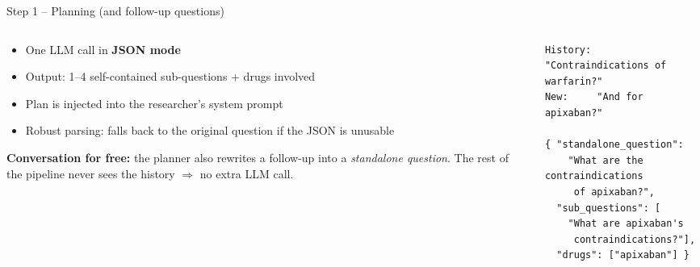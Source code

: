 \documentclass[aspectratio=169,11pt]{beamer}
\begin{document}
\begin{frame}[fragile]{Step 1 -- Planning (and follow-up questions)}
  \begin{columns}[T]
    \begin{column}{0.5\textwidth}
      \begin{itemize}
        \item One LLM call in \textbf{JSON mode}
        \item Output: 1--4 self-contained sub-questions + drugs involved
        \item Plan is injected into the researcher's system prompt
        \item Robust parsing: falls back to the original question if the JSON is unusable
      \end{itemize}
      \vspace{0.5em}
      \textbf{Conversation for free:} the planner also rewrites a follow-up into a
      \emph{standalone question}. The rest of the pipeline never sees the history
      $\Rightarrow$ no extra LLM call.
    \end{column}
    \begin{column}{0.47\textwidth}
\begin{lstlisting}[language={}]
History: "Contraindications of warfarin?"
New:     "And for apixaban?"

{ "standalone_question":
    "What are the contraindications
     of apixaban?",
  "sub_questions": [
    "What are apixaban's
     contraindications?"],
  "drugs": ["apixaban"] }
\end{lstlisting}
    \end{column}
  \end{columns}
\end{frame}
\end{document}
